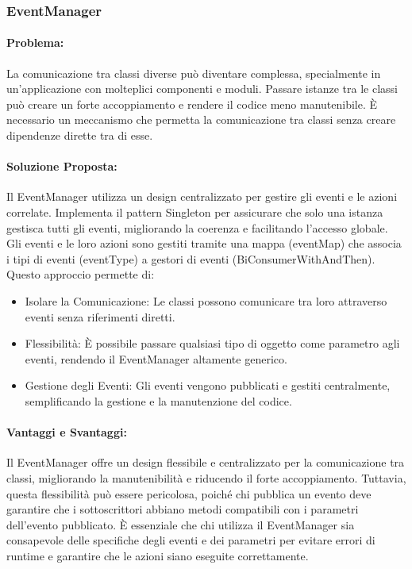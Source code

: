 \documentclass[a4paper,12pt]{report}
\begin{document}
\subsubsection{EventManager}
\paragraph{Problema:} La comunicazione tra classi diverse può diventare complessa, specialmente in un’applicazione con molteplici componenti e moduli. Passare istanze tra le classi può creare un forte accoppiamento e rendere il codice meno manutenibile. È necessario un meccanismo che permetta la comunicazione tra classi senza creare dipendenze dirette tra di esse.
\paragraph{Soluzione Proposta:} Il EventManager utilizza un design centralizzato per gestire gli eventi e le azioni correlate. Implementa il pattern Singleton per assicurare che solo una istanza gestisca tutti gli eventi, migliorando la coerenza e facilitando l’accesso globale. Gli eventi e le loro azioni sono gestiti tramite una mappa (eventMap) che associa i tipi di eventi (eventType) a gestori di eventi (BiConsumerWithAndThen). Questo approccio permette di:
\begin{itemize}
 \item Isolare la Comunicazione: Le classi possono comunicare tra loro attraverso eventi senza riferimenti diretti.
 \item Flessibilità: È possibile passare qualsiasi tipo di oggetto come parametro agli eventi, rendendo il EventManager altamente generico.
 \item Gestione degli Eventi: Gli eventi vengono pubblicati e gestiti centralmente, semplificando la gestione e la manutenzione del codice.
\end{itemize}
\paragraph{Vantaggi e Svantaggi:}
Il EventManager offre un design flessibile e centralizzato per la comunicazione tra classi, migliorando la manutenibilità e riducendo il forte accoppiamento. Tuttavia, questa flessibilità può essere pericolosa, poiché chi pubblica un evento deve garantire che i sottoscrittori abbiano metodi compatibili con i parametri dell’evento pubblicato. È essenziale che chi utilizza il EventManager sia consapevole delle specifiche degli eventi e dei parametri per evitare errori di runtime e garantire che le azioni siano eseguite correttamente.
\end{document}
